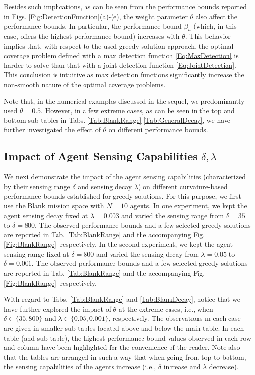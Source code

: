 \documentclass[letterpaper, 10 pt, conference]{ieeeconf}
\begin{document}
Besides such implications, as can be seen from the performance bounds reported in Figs. \ref{Fig:DetectionFunction}(a)-(e), the weight parameter $\theta$ also affect the performance bounds. In particular, the performance bound $\beta_u$ (which, in this case, offers the highest performance bound) increases with $\theta$. This behavior implies that, with respect to the used greedy solution approach, the optimal coverage problem defined with a max detection function \eqref{Eq:MaxDetection} is harder to solve than that with a joint detection function \eqref{Eq:JointDetection}. This conclusion is intuitive as max detection functions significantly increase the non-smooth nature of the optimal coverage problems.

Note that, in the numerical examples discussed in the sequel, we predominantly used $\theta=0.5$. However, in a few extreme cases, as can be seen in the top and bottom sub-tables in Tabs. \ref{Tab:BlankRange}-\ref{Tab:GeneralDecay}, we have further investigated the effect of $\theta$ on different performance bounds. 


\subsection{Impact of Agent Sensing Capabilities $\delta, \lambda$}

We next demonstrate the impact of the agent sensing capabilities (characterized by their sensing range $\delta$ and sensing decay $\lambda$) on different curvature-based performance bounds established for greedy solutions. For this purpose, we first use the Blank mission space with $N=10$ agents. In one experiment, we kept the agent sensing decay fixed at $\lambda = 0.003$ and varied the sensing range from $\delta = 35$ to $\delta = 800$. The observed performance bounds and a few selected greedy solutions are reported in Tab. \ref{Tab:BlankRange} and the accompanying Fig. \ref{Fig:BlankRange}, respectively. In the second experiment, we kept the agent sensing range fixed at $\delta = 800$ and varied the sensing decay from $\lambda = 0.05$ to $\delta = 0.001$. The observed performance bounds and a few selected greedy solutions are reported in Tab. \ref{Tab:BlankRange} and the accompanying Fig. \ref{Fig:BlankRange}, respectively.

With regard to Tabs. \ref{Tab:BlankRange} and \ref{Tab:BlankDecay}, notice that we have further explored the impact of $\theta$ at the extreme cases, i.e., when $\delta \in \{35,800\}$ and $\lambda \in \{0.05,0.001\}$, respectively. The observations in each case are given in smaller sub-tables located above and below the main table. In each table (and sub-table), the highest performance bound values observed in each row and column have been highlighted for the convenience of the reader. Note also that the tables are arranged in such a way that when going from top to bottom, the sensing capabilities of the agents increase (i.e., $\delta$ increase and $\lambda$ decrease).  
\end{document}
